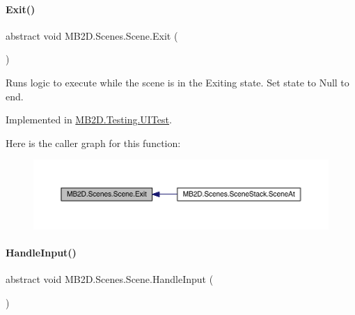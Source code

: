 \paragraph{\texorpdfstring{Exit()}{Exit()}}
{\footnotesize\ttfamily abstract void M\+B2\+D.\+Scenes.\+Scene.\+Exit (\begin{DoxyParamCaption}{ }\end{DoxyParamCaption})\hspace{0.3cm}{\ttfamily [pure virtual]}}



Runs logic to execute while the scene is in the Exiting state. Set state to Null to end. 



Implemented in \hyperlink{class_m_b2_d_1_1_testing_1_1_u_i_test_ad7ad379db3fc9990e634b3edbd4b1a41}{M\+B2\+D.\+Testing.\+U\+I\+Test}.

Here is the caller graph for this function\+:
\nopagebreak
\begin{figure}[H]
\begin{center}
\leavevmode
\includegraphics[width=350pt]{class_m_b2_d_1_1_scenes_1_1_scene_a099b79e16d23b67349847999d2336813_icgraph}
\end{center}
\end{figure}
\hypertarget{class_m_b2_d_1_1_scenes_1_1_scene_a476de5a885408d27ff151044d20738c8}{}\label{class_m_b2_d_1_1_scenes_1_1_scene_a476de5a885408d27ff151044d20738c8} 
\paragraph{\texorpdfstring{Handle\+Input()}{HandleInput()}}
{\footnotesize\ttfamily abstract void M\+B2\+D.\+Scenes.\+Scene.\+Handle\+Input (\begin{DoxyParamCaption}{ }\end{DoxyParamCaption})\hspace{0.3cm}{\ttfamily [pure virtual]}}



